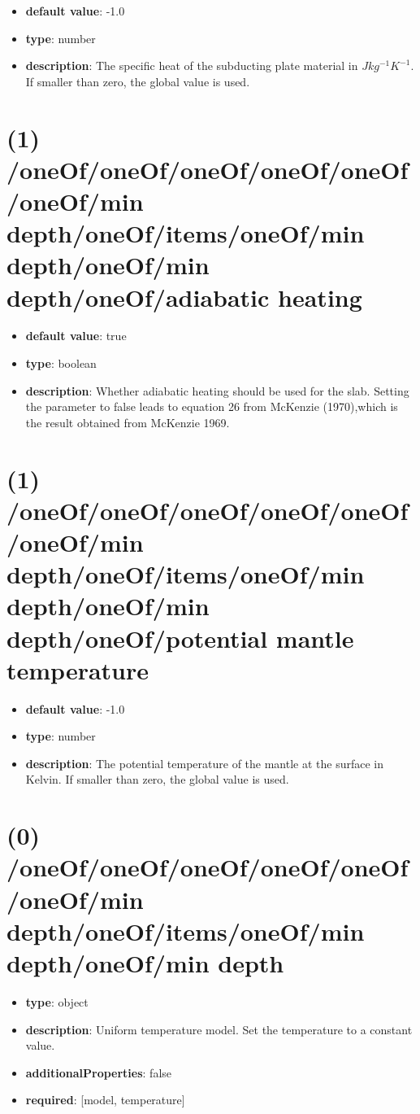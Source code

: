 \begin{itemize}[leftmargin=1em]\item {\bf default value}: -1.0
\item {\bf type}: number
\item {\bf description}: The specific heat of the subducting plate material in $J kg^{-1} K^{-1}$. If smaller than zero, the global value is used.
\end{itemize}\section{(1) /oneOf/oneOf/oneOf/oneOf/oneOf/oneOf/min depth/oneOf/items/oneOf/min depth/oneOf/min depth/oneOf/adiabatic heating}
\begin{itemize}[leftmargin=1em]\item {\bf default value}: true
\item {\bf type}: boolean
\item {\bf description}: Whether adiabatic heating should be used for the slab. Setting the parameter to false leads to equation 26 from McKenzie (1970),which is the result obtained from McKenzie 1969.
\end{itemize}\section{(1) /oneOf/oneOf/oneOf/oneOf/oneOf/oneOf/min depth/oneOf/items/oneOf/min depth/oneOf/min depth/oneOf/potential mantle temperature}
\begin{itemize}[leftmargin=1em]\item {\bf default value}: -1.0
\item {\bf type}: number
\item {\bf description}: The potential temperature of the mantle at the surface in Kelvin. If smaller than zero, the global value is used.
\end{itemize}\section{(0) /oneOf/oneOf/oneOf/oneOf/oneOf/oneOf/min depth/oneOf/items/oneOf/min depth/oneOf/min depth}
\begin{itemize}[leftmargin=0em]\item {\bf type}: object
\item {\bf description}: Uniform temperature model. Set the temperature to a constant value.
\item {\bf additionalProperties}: false
\item {\bf required}: [model, temperature]\end{itemize}

